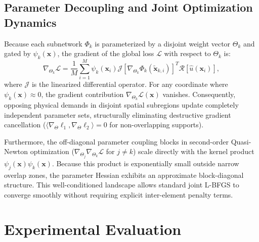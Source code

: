 \documentclass[runningheads]{llncs}
\begin{document}
\subsection{Parameter Decoupling and Joint Optimization Dynamics}
\label{sec:decoupling_dynamics}
Because each subnetwork $\Phi_k$ is parameterized by a disjoint weight vector $\Theta_k$ and gated by $\psi_k(\mathbf{x})$, the gradient of the global loss $\mathcal{L}$ with respect to $\Theta_k$ is:
\begin{equation}
\nabla_{\Theta_k} \mathcal{L} = \frac{1}{M}\sum_{i=1}^M \psi_k(\mathbf{x}_i) \mathcal{J}\left[\nabla_{\Theta_k}\Phi_k(\tilde{\mathbf{x}}_{k,i})\right]^T \mathcal{R}[\hat{u}(\mathbf{x}_i)],
\end{equation}
where $\mathcal{J}$ is the linearized differential operator. For any coordinate where $\psi_k(\mathbf{x}) \approx 0$, the gradient contribution $\nabla_{\Theta_k} \mathcal{L}(\mathbf{x})$ vanishes. Consequently, opposing physical demands in disjoint spatial subregions update completely independent parameter sets, structurally eliminating destructive gradient cancellation ($\langle \nabla_{\Theta} \ell_1, \nabla_{\Theta} \ell_2 \rangle = 0$ for non-overlapping supports).

Furthermore, the off-diagonal parameter coupling blocks in second-order Quasi-Newton optimization ($\nabla_{\Theta_j} \nabla_{\Theta_k} \mathcal{L}$ for $j \neq k$) scale directly with the kernel product $\psi_j(\mathbf{x})\psi_k(\mathbf{x})$. Because this product is exponentially small outside narrow overlap zones, the parameter Hessian exhibits an approximate block-diagonal structure. This well-conditioned landscape allows standard joint L-BFGS to converge smoothly without requiring explicit inter-element penalty terms.

\section{Experimental Evaluation}
\label{sec:experiments}
\end{document}
